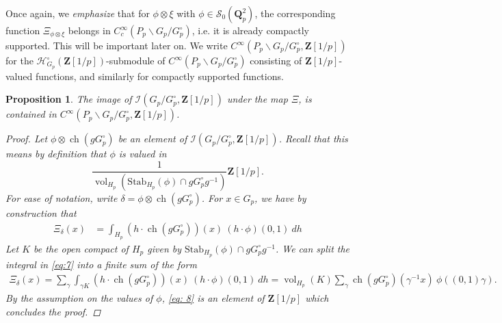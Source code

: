 \documentclass{amsart}%
\theoremstyle{plain}
\newtheorem{prop}[thm]{Proposition}
\theoremstyle{plain}
\theoremstyle{remark}
\DeclareMathOperator{\ch}{ch}
\DeclareMathOperator{\vol}{vol}
\begin{document}
Once again, we \textit{emphasize} that for $\phi\otimes \xi$ with $\phi\in\mathcal{S}_0(\mathbf{Q}_p^2)$, the corresponding function $\Xi_{\phi\otimes \xi}$ belongs in $C_c^\infty(P_p\backslash G_p/G_p^\circ)$, i.e. it is already compactly supported. This will be important later on. We write $C^\infty(P_p\backslash G_p/G_p^\circ,\mathbf{Z}[1/p])$ for the $\mathcal{H}_{G_p}^\circ(\mathbf{Z}[1/p])$-submodule of $C^\infty(P_p\backslash G_p/ G_p^\circ)$ consisting of $\mathbf{Z}[1/p]$-valued functions, and similarly for compactly supported functions.

\begin{prop}\label{prop integrally from coinvariants to C^infinity}
    The image of $\mathcal{I}(G_p/G_p^\circ,\mathbf{Z}[1/p])$ under the map $\Xi$, is contained in $C^\infty(P_p\backslash G_p/G_p^\circ,\mathbf{Z}[1/p])$.
    \begin{proof}
        Let $\phi\otimes \ch(gG_p^\circ)$ be an element of $\mathcal{I}(G_p/G_p^\circ,\mathbf{Z}[1/p])$. Recall that this means by definition that $\phi$ is valued in 
        $$\frac{1}{\vol_{H_p}\left(\mathrm{Stab}_{H_p}(\phi)\cap g G_p^\circ g^{-1}\right)}\mathbf{Z}[1/p].$$
        For ease of notation, write $\delta=\phi\otimes \ch(gG_p^\circ)$.
        For $x\in G_p$, we have by construction that
        \begin{align}\label{eq:7}
            \Xi_\delta(x)&=\int_{H_p}\left(h\cdot \ch(gG_p^\circ)\right)(x)\ (h\cdot \phi)(0,1)\ dh
        \end{align}
        Let $K$ be the open compact of $H_p$ given by $\mathrm{Stab}_{H_p}(\phi)\cap g G_p^\circ g^{-1}$. We can split the integral in \eqref{eq:7} into a finite sum of the form  
        \begin{align}\label{eq: 8}\Xi_\delta(x)=\sum_\gamma \int_{\gamma K}\left(h\cdot \ch(gG_p^\circ)\right)(x)\ (h\cdot \phi)(0,1)\ dh=\vol_{H_p}(K)\sum_\gamma \ch(gG_p^\circ)(\gamma^{-1}x)\ \phi((0,1)\gamma).\end{align}
        By the assumption on the values of $\phi$, \eqref{eq: 8} is an element of $\mathbf{Z}[1/p]$ which concludes the proof.
    \end{proof}
\end{prop}
\end{document}
